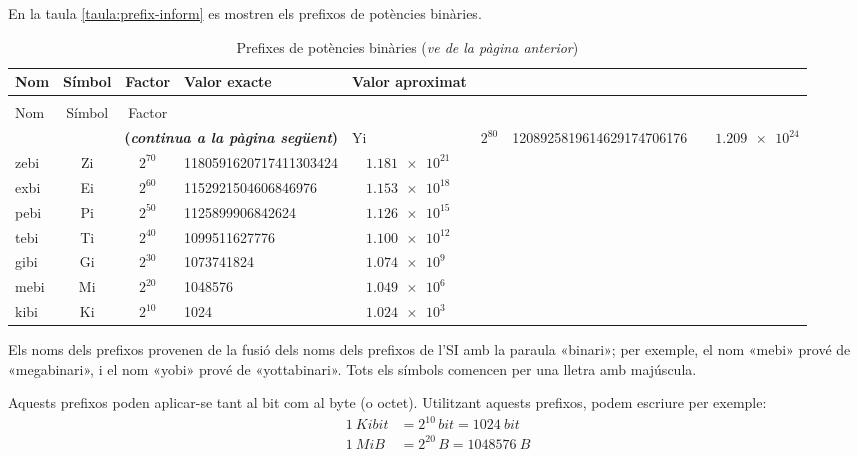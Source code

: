 En la taula \vref{taula:prefix-inform} es mostren els prefixos de potències binàries.
\begin{longtable}[h]{lccll}
   \caption{\label{taula:prefix-inform} Prefixos de potències binàries}\\
   \toprule[1pt]
    Nom & Símbol  & Factor & Valor exacte & Valor aproximat\\
   \midrule
   \endfirsthead
   \caption[]{Prefixes de potències binàries (\emph{ve de la pàgina anterior})}\\
   \toprule[1pt]
    Nom & Símbol  & Factor \\
   \midrule
   \endhead
   \midrule
   \multicolumn{4}{r}{\sffamily\bfseries\color{NavyBlue}(\emph{continua a la pàgina següent})}
   \endfoot
   \endlastfoot
   yobi & Yi   & $2^{80}$ & \num{1208925819614629174706176} &  $\quad\num{1,209e24}$ \\
   zebi & Zi   & $2^{70}$ & \num{1180591620717411303424}&  $\quad\num{1,181e21}$ \\
   exbi & Ei   & $2^{60}$ & \num{1152921504606846976}&  $\quad\num{1,153e18}$ \\
   pebi & Pi   & $2^{50}$ & \num{1125899906842624}&  $\quad\num{1,126e15}$ \\
   tebi & Ti   & $2^{40}$ & \num{1099511627776}&  $\quad\num{1,100e12}$ \\
   gibi & Gi   & $2^{30}$ & \num{1073741824}&  $\quad\num{1,074e9}$  \\
   mebi & Mi   & $2^{20}$ & \num{1048576} &  $\quad\num{1,049e6}$ \\
   kibi & Ki   & $2^{10}$ & \num{1024} & $\quad\num{1,024e3}$  \\
   \bottomrule[1pt]
\end{longtable}
        
   


Els noms dels prefixos provenen de la fusió dels noms dels prefixos de l'SI amb la paraula «binari»; per exemple, el nom «mebi» prové de «megabinari», i el nom «yobi» prové de «yottabinari». Tots els símbols comencen per una lletra amb majúscula. 

Aquests prefixos poden aplicar-se tant al bit com al byte (o octet). Utilitzant aquests prefixos, podem escriure per exemple:
\begin{align*}
	\qty{1}{Kibit} &= 2^{10}\unit{\,bit} = \qty{1024}{bit} \\
	\qty{1}{MiB} &= 2^{20}\unit{\,B} = \qty{1048576}{B}
\end{align*}


